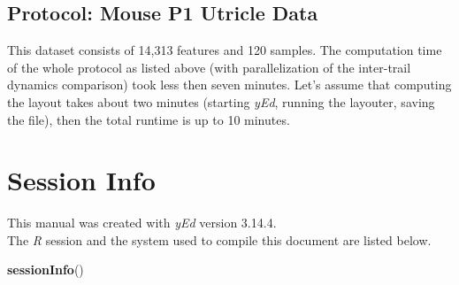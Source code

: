 \documentclass[]{book}
\newenvironment{Shaded}{\begin{snugshade}}{\end{snugshade}}
\newcommand{\KeywordTok}[1]{\textcolor[rgb]{0.13,0.29,0.53}{\textbf{#1}}}
\newcommand{\NormalTok}[1]{#1}
\theoremstyle{definition}
\theoremstyle{definition}
\theoremstyle{definition}
\theoremstyle{remark}
\begin{document}
\subsection{Protocol: Mouse P1 Utricle
Data}\label{protocol-mouse-p1-utricle-data}

This dataset consists of 14,313 features and 120 samples. The
computation time of the whole protocol as listed above (with
parallelization of the inter-trail dynamics comparison) took less then
seven minutes. Let's assume that computing the layout takes about two
minutes (starting \emph{yEd}, running the layouter, saving the file),
then the total runtime is up to 10 minutes.

\section{Session Info}\label{session-info}

This manual was created with \emph{yEd} version 3.14.4.\\
The \emph{R} session and the system used to compile this document are
listed below.

\begin{Shaded}
\begin{Highlighting}[]
\KeywordTok{sessionInfo}\NormalTok{()}
\end{Highlighting}
\end{Shaded}
\end{document}
